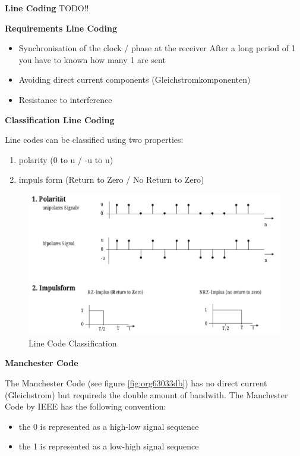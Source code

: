 \documentclass[11pt,twoside,twocolumn,landscape]{article}
\begin{document}
\textbf{Line Coding}
TODO!!

\textbf{Requirements Line Coding}

\begin{itemize}
\item Synchronisation of the clock / phase at the receiver
After a long period of 1 you have to known how many 1 are sent
\item Avoiding direct current components (Gleichstromkomponenten)
\item Resistance to interference
\end{itemize}


\textbf{Classification Line Coding}

Line codes can be classified using two properties:
\begin{enumerate}
\item polarity (0 to u / -u to u)
\item impuls form (Return to Zero / No Return to Zero)
\end{enumerate}


\begin{figure}[htbp]
\centering
\includegraphics[width=.9\linewidth]{img/line_code_classification.png}
\caption{Line Code Classification}
\end{figure}

\textbf{Manchester Code}

The Manchester Code (see figure \ref{fig:org63033db}) has no direct current (Gleichstrom) but requireds the double amount of bandwith.
The Manchester Code by IEEE has the following convention:
\begin{itemize}
\item the 0 is represented as a high-low signal sequence
\item the 1 is represented as a low-high signal sequence
\end{itemize}
\end{document}

